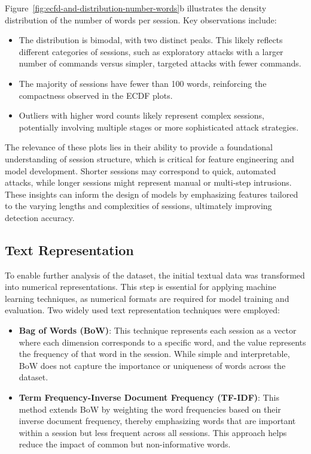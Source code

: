         Figure~\ref{fig:ecfd-and-distribution-number-words}b illustrates the density distribution of the number of words per session. Key observations include:
        
        \begin{itemize}
        
            \item The distribution is bimodal, with two distinct peaks. This likely reflects different categories of sessions, such as exploratory attacks with a larger number of commands versus simpler, targeted attacks with fewer commands.
            
            \item The majority of sessions have fewer than 100 words, reinforcing the compactness observed in the ECDF plots.
            
            \item Outliers with higher word counts likely represent complex sessions, potentially involving multiple stages or more sophisticated attack strategies.
            
        \end{itemize}

        The relevance of these plots lies in their ability to provide a foundational understanding of session structure, which is critical for feature engineering and model development. Shorter sessions may correspond to quick, automated attacks, while longer sessions might represent manual or multi-step intrusions. These insights can inform the design of models by emphasizing features tailored to the varying lengths and complexities of sessions, ultimately improving detection accuracy.

    \subsection{Text Representation}

        To enable further analysis of the dataset, the initial textual data was transformed into numerical representations. This step is essential for applying machine learning techniques, as numerical formats are required for model training and evaluation. Two widely used text representation techniques were employed:

        \begin{itemize}
            \item \textbf{Bag of Words (BoW)}: This technique represents each session as a vector where each dimension corresponds to a specific word, and the value represents the frequency of that word in the session. While simple and interpretable, BoW does not capture the importance or uniqueness of words across the dataset.
            \item \textbf{Term Frequency-Inverse Document Frequency (TF-IDF)}: This method extends BoW by weighting the word frequencies based on their inverse document frequency, thereby emphasizing words that are important within a session but less frequent across all sessions. This approach helps reduce the impact of common but non-informative words.
        \end{itemize}

